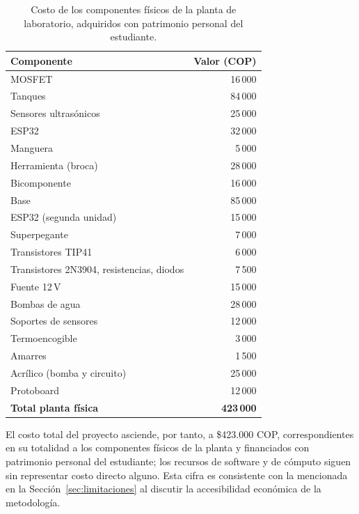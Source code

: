 \documentclass[12pt,letterpaper]{article}
\begin{document}
\begin{table}[H]
\centering
\caption{Costo de los componentes físicos de la planta de laboratorio, adquiridos con
patrimonio personal del estudiante.}
\label{tab:presupuesto_planta}
\begin{tabular}{lr}
\toprule
\textbf{Componente} & \textbf{Valor (COP)} \\
\midrule
MOSFET & 16\,000 \\
Tanques & 84\,000 \\
Sensores ultrasónicos & 25\,000 \\
ESP32 & 32\,000 \\
Manguera & 5\,000 \\
Herramienta (broca) & 28\,000 \\
Bicomponente & 16\,000 \\
Base & 85\,000 \\
ESP32 (segunda unidad) & 15\,000 \\
Superpegante & 7\,000 \\
Transistores TIP41 & 6\,000 \\
Transistores 2N3904, resistencias, diodos & 7\,500 \\
Fuente 12\,V & 15\,000 \\
Bombas de agua & 28\,000 \\
Soportes de sensores & 12\,000 \\
Termoencogible & 3\,000 \\
Amarres & 1\,500 \\
Acrílico (bomba y circuito) & 25\,000 \\
Protoboard & 12\,000 \\
\midrule
\textbf{Total planta física} & \textbf{423\,000} \\
\bottomrule
\end{tabular}
\end{table}

El costo total del proyecto asciende, por tanto, a \$423.000 COP, correspondientes en
su totalidad a los componentes físicos de la planta y financiados con patrimonio
personal del estudiante; los recursos de software y de cómputo siguen sin representar
costo directo alguno. Esta cifra es consistente con la mencionada en la
Sección~\ref{sec:limitaciones} al discutir la accesibilidad económica de la
metodología.
\end{document}
